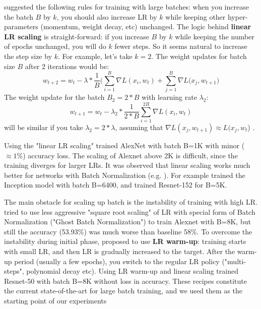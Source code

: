 \documentclass{article} %
\begin{document}
\cite{krizhevsky2014one} suggested the following rules for training with large batches: when you increase the batch $B$ by $k$,  you should also increase LR by $k$  while keeping other hyper-parameters (momentum, weight decay, etc) unchanged. The logic behind {\bf linear LR scaling} is straight-forward: if you increase $B$ by $k$ while keeping the number of epochs unchanged, you will do $k$ fewer steps. So it seems natural to increase the step size by $k$. 
For example, let's take $k=2$. The weight updates for batch size $B$ after 2 iterations would be:
\begin{equation}
  w_{t+2} = w_t - \lambda * \frac{1}{B} 
  \bigl( {\sum}_{i=1}^{B} \nabla L(x_i, w_t) +  {\sum}_{j=1}^{B} \nabla L(x_j,  w_{t+1} \bigr)
\end{equation}
The weight update for the batch $B_2=2*B$ with learning rate $\lambda_2$:
\begin{equation}
  w_{t+1} = w_{t} - \lambda_2 * \frac{1}{2*B}  {\sum}_{i=1}^{2B} \nabla L(x_i, w_t)
\end{equation}
will be similar if you take $\lambda_2 = 2* \lambda$, assuming that $\nabla  L(x_j,  w_{t+1}) \approx  L(x_j,  w_t $) . 

Using the "linear LR scaling"  \cite{krizhevsky2014one} trained AlexNet with batch B=1K with minor ($\approx 1\%$) accuracy loss. The scaling of Alexnet above 2K is difficult, since the training diverges for larger LRs. 
It was observed that linear scaling works much better for networks with Batch Normalization (e.g. \cite{codreanu2017xeonphi}). For example   \cite{chen2016revisiting} trained the Inception model with batch B=6400, and  \cite{li2017scaling} trained Resnet-152 for B=5K. 
 
The main obstacle for scaling up batch  is the instability of training with high LR.   \cite{hoffer2017train} tried to use less aggressive "square root scaling" of LR with special form of Batch Normalization ("Ghost Batch Normalization") to train Alexnet with B=8K, but still the accuracy (53.93\%) was much worse than baseline 58\%. 
To overcome the instability during initial phase, \cite{goyal2017accurate}  proposed  to use {\bf LR warm-up}: training starts with small LR, and then LR is gradually increased to the target. After the warm-up period (usually a few epochs), you switch to the regular LR policy ("multi-steps", polynomial decay etc). Using LR warm-up and linear scaling  \cite{goyal2017accurate} trained Resnet-50 with batch B=8K without loss in accuracy. These recipes constitute the current state-of-the-art for large batch training, and we used them as the starting point of our experiments
\end{document}
